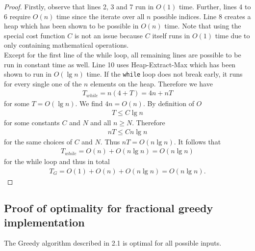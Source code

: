 \documentclass{article}
\begin{document}
\begin{proof}
	Firstly, observe that lines 2, 3 and 7 run in $O(1)$ time. Further,
	lines 4 to 6 require $O(n)$ time since the iterate over all $n$
	possible indices. Line 8 creates a heap which has been shown to be possible
	in $O(n)$ time. Note that using the special cost function $C$ is not
	an issue because $C$ itself runs in $O(1)$ time due to only containing
	mathematical operations.\\
	Except for the first line of the while loop, all remaining lines are
	possible to be run in constant time as well. Line 10 uses Heap-Extract-Max
	which has been shown to run in $O(\lg n)$ time. If the \texttt{while}
	loop does not break early, it runs for every single one of the $n$
	elements on the heap. Therefore we have
	\begin{align*}
		T_{while} = n(4+T) = 4n + nT
	\end{align*}
	for some $T=O(\lg n)$. We find $4n=O(n)$. By definition of $O$
	\begin{align*}
		T \leq C\lg n
	\end{align*}
	for some constants $C$ and $N$ and all $n\geq N$. Therefore
	\begin{align*}
		nT \leq Cn\lg n
	\end{align*}
	for the same choices of $C$ and $N$. Thus $nT=O(n\lg n)$. It follows that
	\begin{align*}
		T_{while} = O(n) + O(n\lg n) = O(n\lg n)
	\end{align*}
	for the while loop and thus in total
	\begin{align*}
		T_G = O(1) + O(n) + O(n\lg n) = O(n\lg n).
	\end{align*}
\end{proof}

\subsection{Proof of optimality for fractional greedy implementation}

\begin{claim}
	The Greedy algorithm described in 2.1 is optimal for all possible inputs.
\end{claim}
\end{document}

